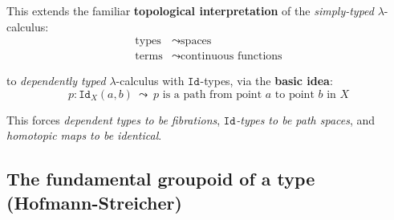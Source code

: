 \documentclass[11pt]{article}
\newcommand{\myemph}[1]{\textbf{#1}}    %
\newcommand{\id}[1]{\texttt{Id}_{#1}}
\begin{document}
%
%

This extends the familiar \myemph{topological interpretation} of the \emph{simply-typed} $\lambda$-calculus: 
\begin{align*}
\text{types} &\leadsto \text{spaces}\\
\text{terms} &\leadsto \text{continuous functions}
 \end{align*}


to \emph{dependently typed} $\lambda$-calculus with $\id{}$-types, via the \myemph{basic idea}:
\[
p : \id{X}(a,b)\ \leadsto\ \text{$p$ is a path from point $a$ to point $b$ in $X$}
\]

This forces \emph{dependent types to be fibrations}, 
$\id{}$\emph{-types to be path spaces}, and \emph{homotopic maps to be identical}.

\subsection*{The fundamental groupoid of a type (Hofmann-Streicher)}
\end{document}
